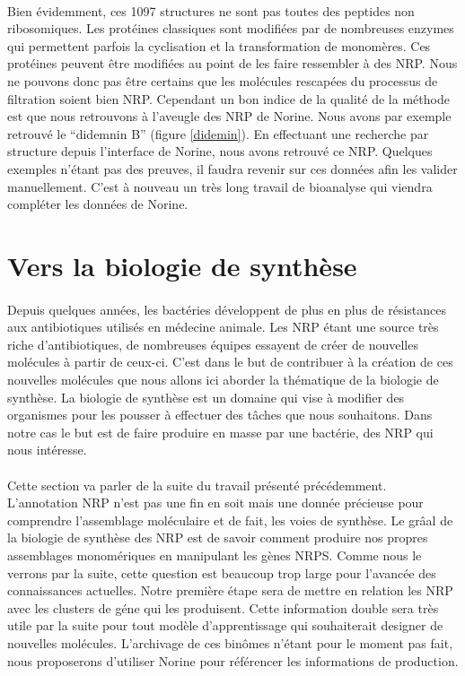 \documentclass[12pt,french,twoside]{report}
\begin{document}
\paragraph{}Bien évidemment, ces 1097 structures ne sont pas toutes des peptides non ribosomiques.
Les protéines classiques sont modifiées par de nombreuses enzymes qui permettent parfois la cyclisation et la transformation de monomères.
Ces protéines peuvent être modifiées au point de les faire ressembler à des NRP.
Nous ne pouvons donc pas être certains que les molécules rescapées du processus de filtration soient bien NRP.
Cependant un bon indice de la qualité de la méthode est que nous retrouvons à l'aveugle des NRP de Norine.
Nous avons par exemple retrouvé le ``didemnin B'' (figure \ref{didemin}).
En effectuant une recherche par structure depuis l'interface de Norine, nous avons retrouvé ce NRP.
Quelques exemples n'étant pas des preuves, il faudra revenir sur ces données afin les valider manuellement.
C'est à nouveau un très long travail de bioanalyse qui viendra compléter les données de Norine.




\section{Vers la biologie de synthèse}

\paragraph{}Depuis quelques années, les bactéries développent de plus en plus de résistances aux antibiotiques utilisés en médecine animale.
Les NRP étant une source très riche d'antibiotiques, de nombreuses équipes essayent de créer de nouvelles molécules à partir de ceux-ci.
C'est dans le but de contribuer à la création de ces nouvelles molécules que nous allons ici aborder la thématique de la biologie de synthèse.
La biologie de synthèse est un domaine qui vise à modifier des organismes pour les pousser à effectuer des tâches que nous souhaitons.
Dans notre cas le but est de faire produire en masse par une bactérie, des NRP qui nous intéresse.

\paragraph{}Cette section va parler de la suite du travail présenté précédemment.
L'annotation NRP n'est pas une fin en soit mais une donnée précieuse pour comprendre l'assemblage moléculaire et de fait, les voies de synthèse.
Le grâal de la biologie de synthèse des NRP est de savoir comment produire nos propres assemblages monomériques en manipulant les gènes NRPS.
Comme nous le verrons par la suite, cette question est beaucoup trop large pour l'avancée des connaissances actuelles.
Notre première étape sera de mettre en relation les NRP avec les clusters de géne qui les produisent.
Cette information double sera très utile par la suite pour tout modèle d'apprentissage qui souhaiterait designer de nouvelles molécules.
L'archivage de ces binômes n'étant pour le moment pas fait, nous proposerons d'utiliser Norine pour référencer les informations de production.
\end{document}
